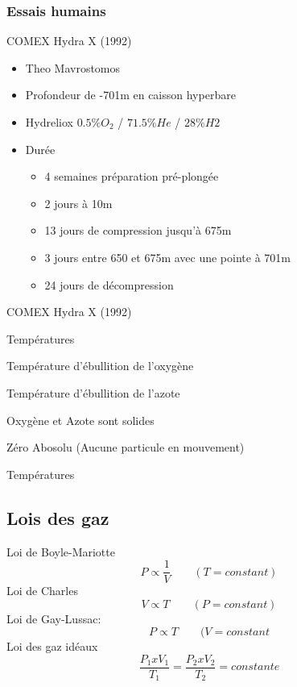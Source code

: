 \documentclass[aspectratio=1610,english,12pt]{beamer}
\begin{document}
\subsubsection{Essais humains}
\begin{frame}{COMEX Hydra X (1992)}
	\begin{itemize}
		\item Theo Mavrostomos
		\item Profondeur de -701m en caisson hyperbare
		\item Hydreliox $0.5\% O_2$ / $71.5\% He$ / $28\% H2$
		\item Durée
		\begin{itemize}
			\item 4 semaines préparation pré-plongée
			\item 2 jours à 10m
			\item 13 jours de compression jusqu'à 675m
			\item 3 jours entre 650 et 675m avec une pointe à 701m
			\item 24 jours de décompression
		\end{itemize}
	\end{itemize}
\end{frame}

\begin{frame}{COMEX Hydra X (1992)}
\end{frame}

\begin{frame}{Températures}
	\begin{description}[lalign=parleft]
		\item[$-183^{\circ}C$]Température d'ébullition de l'oxygène
		\item[$-196^{\circ}C$]Température d'ébullition de l'azote	
		\item[$-220^{\circ}C$]Oxygène et Azote sont solides
		\item[$-273^{\circ}C$]Zéro Abosolu (Aucune particule en mouvement)
	\end{description}
\end{frame}

\begin{frame}{Températures}
\end{frame}

\subsection{Lois des gaz}
\begin{frame}{\insertsubsection}
	Loi de Boyle-Mariotte
	\[	P \propto \frac{1}{V} \qquad (T=constant) \]
	Loi de Charles
	\[	V \propto T \qquad (P=constant)\]
	Loi de Gay-Lussac:
	\[ P \propto T \qquad (V=constant\]
	Loi des gaz idéaux
	\[	\frac{P_1 x V_1}{T_1} =\frac{P_2 x V_2}{T_2} = constante\]
\end{frame}
\end{document}
